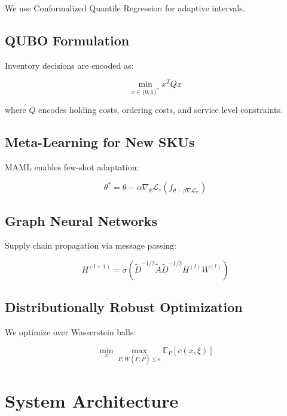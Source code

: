 \documentclass[11pt,a4paper]{article}
\begin{document}
We use Conformalized Quantile Regression for adaptive intervals.

\subsection{QUBO Formulation}

Inventory decisions are encoded as:

\begin{equation}
    \min_{x \in \{0,1\}^n} x^T Q x
\end{equation}

where $Q$ encodes holding costs, ordering costs, and service level constraints.

\subsection{Meta-Learning for New SKUs}

MAML enables few-shot adaptation:

\begin{equation}
    \theta^* = \theta - \alpha \nabla_\theta \mathcal{L}_{\tau}(f_{\theta - \beta \nabla \mathcal{L}_{\tau'}})
\end{equation}

\subsection{Graph Neural Networks}

Supply chain propagation via message passing:

\begin{equation}
    H^{(l+1)} = \sigma(\tilde{D}^{-1/2}\tilde{A}\tilde{D}^{-1/2}H^{(l)}W^{(l)})
\end{equation}

\subsection{Distributionally Robust Optimization}

We optimize over Wasserstein balls:

\begin{equation}
    \min_x \max_{P: W(P, \hat{P}) \leq \epsilon} \mathbb{E}_P[c(x, \xi)]
\end{equation}

\section{System Architecture}
\end{document}
